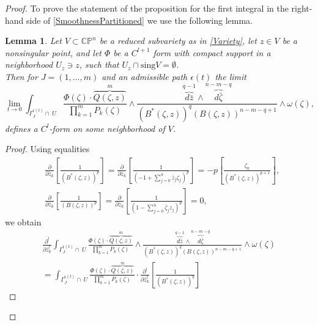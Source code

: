 \documentclass[11pt,reqno]{amsart}
\numberwithin{equation}{section}
\newtheorem{lemma}[proposition]{Lemma}
\begin{document}
\begin{proof}
\indent
To prove the statement of the proposition for the first integral in the right-hand side
of \eqref{SmoothnessPartitioned} we use the following lemma.

\begin{lemma}\label{LocalSmoothness} Let $V\subset {{\mathbb C}}{{\mathbb P}}^n$ be a reduced subvariety
as in \eqref{Variety}, let $z\in V$ be a nonsingular point, and let $\Phi$
be a $C^{l+1}$ form with compact support in a neighborhood $U_z\ni z$, such that $U_z\cap\text{sing}V=\emptyset$.\\
\indent
Then for $J=(1,\dots,m)$ and an admissible path $\epsilon(t)$ the limit
\begin{equation}\label{SmoothIntegral}
\lim_{t\to 0}\int_{\Gamma^{\epsilon(t)}_J\cap\ U}
\frac{\Phi(\zeta)\cdot\overbrace{Q(\zeta,z)}^{m}}{\prod_{k=1}^mP_k(\zeta)}
\wedge\frac{\overbrace{d{\bar z}}^{q-1}\wedge\overbrace{d{\bar\zeta}}^{n-m-q}}
{\left(B^*(\zeta,z)\right)^{q}\left(B(\zeta,z)\right)^{n-m-q+1}}\wedge\omega(\zeta),
\end{equation}
defines a $C^{l}$-form on some neighborhood of $V$.
\end{lemma}
\begin{proof} Using equalities
\begin{equation}\label{BarZEqualities}
\begin{aligned}
&\frac{\partial}{\partial{\bar z}_k}
\left[\frac{1}{\left(B^*(\zeta,z)\right)^p}\right]
=\frac{\partial}{\partial{\bar z}_k}
\left[\frac{1}{\left(-1+\sum_{j=0}^n{\bar z}_j\zeta_j\right)^{p}}\right]
=-p\left[\frac{\zeta_k}{\left(B^*(\zeta,z)\right)^{p+1}}\right],\\
&\frac{\partial}{\partial{\bar z}_k}
\left[\frac{1}{\left(B(\zeta,z)\right)^p}\right]
=\frac{\partial}{\partial{\bar z}_k}
\left[\frac{1}{\left(1-\sum_{j=0}^n{\bar\zeta}_jz_j\right)^{p}}\right]=0,
\end{aligned}
\end{equation}
we obtain
\begin{multline*}
\frac{\partial^l}{\partial{\bar z}_k^l}\int_{\Gamma^{\epsilon(t)}_J\cap\ U}
\frac{\Phi(\zeta)\cdot\overbrace{Q(\zeta,z)}^{m}}{\prod_{k=1}^mP_k(\zeta)}
\wedge\frac{\overbrace{d{\bar z}}^{q-1}\wedge\overbrace{d{\bar\zeta}}^{n-m-q}}
{\left(B^*(\zeta,z)\right)^{q}\left(B(\zeta,z)\right)^{n-m-q+1}}\wedge\omega(\zeta)\\
=\int_{\Gamma^{\epsilon(t)}_J\cap\ U}
\frac{\Phi(\zeta)\cdot\overbrace{Q(\zeta,z)}^{m}}{\prod_{k=1}^mP_k(\zeta)}
\cdot\frac{\partial^l}{\partial{\bar z}_k^l}\left[\frac{1}{\left(B^*(\zeta,z)\right)^{q}}\right]

\end{multline*}
\end{proof}
\end{proof}
\end{document}
